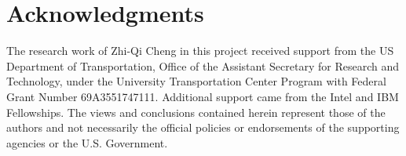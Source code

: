 \documentclass{article}
\begin{document}
\section*{Acknowledgments}
{\small The research work of Zhi-Qi Cheng in this project received support from the US Department of Transportation, Office of the Assistant Secretary for Research and Technology, under the University Transportation Center Program with Federal Grant Number 69A3551747111. Additional support came from the Intel and IBM Fellowships. The views and conclusions contained herein represent those of the authors and not necessarily the official policies or endorsements of the supporting agencies or the U.S. Government.}


\end{document}

